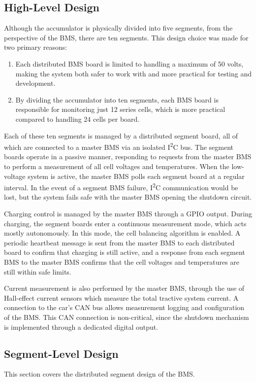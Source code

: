 \documentclass[12pt, a4paper]{article}
\newcommand{\iic}{I\textsuperscript{2}C}
\begin{document}
\subsection{High-Level Design}
Although the accumulator is physically divided into five segments, from the perspective of the BMS, there are ten segments.
This design choice was made for two primary reasons:
\begin{enumerate}[label=(\arabic*)]
\item Each distributed BMS board is limited to handling a maximum of 50 volts, making the system both safer to work with and more practical for testing and development.
\item By dividing the accumulator into ten segments, each BMS board is responsible for monitoring just 12 series cells, which is more practical compared to handling 24 cells per board.
\end{enumerate}

Each of these ten segments is managed by a distributed segment board, all of which are connected to a master BMS via an isolated \iic{} bus.
The segment boards operate in a passive manner, responding to requests from the master BMS to perform a measurement of all cell voltages and temperatures.
When the low-voltage system is active, the master BMS polls each segment board at a regular interval.
In the event of a segment BMS failure, \iic{} communication would be lost, but the system fails safe with the master BMS opening the shutdown circuit.

Charging control is managed by the master BMS through a GPIO output.
During charging, the segment boards enter a continuous measurement mode, which acts mostly autonomously.
In this mode, the cell balancing algorithm is enabled.
A periodic heartbeat message is sent from the master BMS to each distributed board to confirm that charging is still active, and a response from each segment BMS to the master BMS confirms that the cell voltages and temperatures are still within safe limits.

Current measurement is also performed by the master BMS, through the use of Hall-effect current sensors which measure the total tractive system current.
A connection to the car's CAN bus allows measurement logging and configuration of the BMS.
This CAN connection is non-critical, since the shutdown mechanism is implemented through a dedicated digital output.

\subsection{Segment-Level Design}
This section covers the distributed segment design of the BMS.
\end{document}
